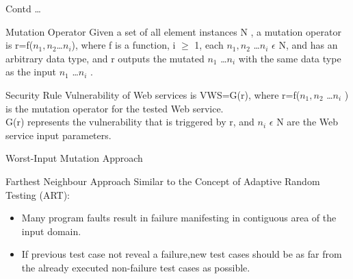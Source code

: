 \documentclass[10pt]{beamer}
\begin{document}
\begin{frame}{Contd \dots}
\begin{block}{Mutation Operator}
Given a set of all element instances N , a mutation operator is
r=f($n_1,n_2$\dots $n_i$), where f is a function, i $\geq$ 1, each
$n_1, n_2$ \dots $n_i$ $\epsilon$ N, and has an arbitrary data type, and r outputs the mutated $n_1$ \dots $n_i$ with the same data type
as the input $n_1$ \dots $n_i$ .
\end{block}
\begin{block}{Security Rule}
Vulnerability of Web services
is VWS=G(r), where r=f($n_1,n_2$ \dots $n_i$ ) is the mutation operator for the tested Web service.\\
G(r) represents the vulnerability that is triggered by r, and
$n_i$ $\epsilon$ N are the Web service input parameters.
\end{block}
\end{frame}
\begin{frame}{Worst-Input Mutation Approach}
\begin{block}{Farthest Neighbour Approach}
Similar to the Concept of Adaptive Random Testing (ART):\\

\begin{itemize}
\item Many program faults result in failure manifesting in contiguous area of the input domain.
\item If previous test case not reveal a failure,new test cases should be as far from the already executed non-failure test cases as possible.
\end{itemize}
\end{block}
\end{frame}

	
\end{document}
